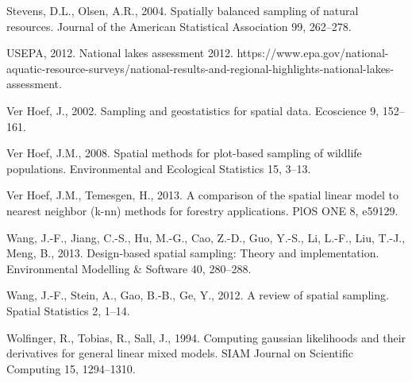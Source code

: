 \documentclass[]{elsarticle} %
\begin{document}
\leavevmode\hypertarget{ref-stevens2004spatially}{}%
Stevens, D.L., Olsen, A.R., 2004. Spatially balanced sampling of natural
resources. Journal of the American Statistical Association 99, 262--278.

\leavevmode\hypertarget{ref-USEPA2012NLA}{}%
USEPA, 2012. National lakes assessment 2012.
https://www.epa.gov/national-aquatic-resource-surveys/national-results-and-regional-highlights-national-lakes-assessment.

\leavevmode\hypertarget{ref-verhoef2002sampling}{}%
Ver Hoef, J., 2002. Sampling and geostatistics for spatial data.
Ecoscience 9, 152--161.

\leavevmode\hypertarget{ref-verhoef2008spatial}{}%
Ver Hoef, J.M., 2008. Spatial methods for plot-based sampling of
wildlife populations. Environmental and Ecological Statistics 15, 3--13.

\leavevmode\hypertarget{ref-ver2013comparison}{}%
Ver Hoef, J.M., Temesgen, H., 2013. A comparison of the spatial linear
model to nearest neighbor (k-nn) methods for forestry applications. PlOS
ONE 8, e59129.

\leavevmode\hypertarget{ref-wang2013design}{}%
Wang, J.-F., Jiang, C.-S., Hu, M.-G., Cao, Z.-D., Guo, Y.-S., Li, L.-F.,
Liu, T.-J., Meng, B., 2013. Design-based spatial sampling: Theory and
implementation. Environmental Modelling \& Software 40, 280--288.

\leavevmode\hypertarget{ref-wang2012review}{}%
Wang, J.-F., Stein, A., Gao, B.-B., Ge, Y., 2012. A review of spatial
sampling. Spatial Statistics 2, 1--14.

\leavevmode\hypertarget{ref-wolfinger1994computing}{}%
Wolfinger, R., Tobias, R., Sall, J., 1994. Computing gaussian
likelihoods and their derivatives for general linear mixed models. SIAM
Journal on Scientific Computing 15, 1294--1310.
\end{document}
